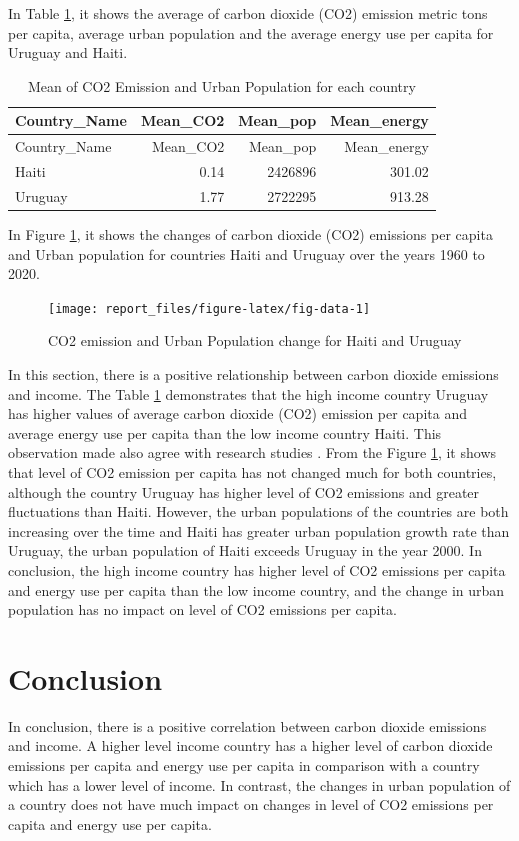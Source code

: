 \documentclass[11pt,a4paper,]{article}
\begin{document}
In Table \ref{tab:mean}, it shows the average of carbon dioxide (CO2) emission metric tons per capita, average urban population and the average energy use per capita for Uruguay and Haiti.

\begin{longtable}[]{@{}lrrr@{}}
\caption{\label{tab:mean}Mean of CO2 Emission and Urban Population for each country}\tabularnewline
\toprule
Country\_Name & Mean\_CO2 & Mean\_pop & Mean\_energy \\
\midrule
\endfirsthead
\toprule
Country\_Name & Mean\_CO2 & Mean\_pop & Mean\_energy \\
\midrule
\endhead
Haiti & 0.14 & 2426896 & 301.02 \\
Uruguay & 1.77 & 2722295 & 913.28 \\
\bottomrule
\end{longtable}

In Figure \ref{fig:fig-data}, it shows the changes of carbon dioxide (CO2) emissions per capita and Urban population for countries Haiti and Uruguay over the years 1960 to 2020.

\begin{figure}

{\centering \texttt{[image: report\_files/figure-latex/fig-data-1]} 

}

\caption{CO2 emission and Urban Population change for Haiti and Uruguay}\label{fig:fig-data}
\end{figure}

In this section, there is a positive relationship between carbon dioxide emissions and income. The Table \ref{tab:mean} demonstrates that the high income country Uruguay has higher values of average carbon dioxide (CO2) emission per capita and average energy use per capita than the low income country Haiti. This observation made also agree with research studies \textcite{COGDP}. From the Figure \ref{fig:fig-data}, it shows that level of CO2 emission per capita has not changed much for both countries, although the country Uruguay has higher level of CO2 emissions and greater fluctuations than Haiti. However, the urban populations of the countries are both increasing over the time and Haiti has greater urban population growth rate than Uruguay, the urban population of Haiti exceeds Uruguay in the year 2000. In conclusion, the high income country has higher level of CO2 emissions per capita and energy use per capita than the low income country, and the change in urban population has no impact on level of CO2 emissions per capita.

\section*{Conclusion}

In conclusion, there is a positive correlation between carbon dioxide emissions and income. A higher level income country has a higher level of carbon dioxide emissions per capita and energy use per capita in comparison with a country which has a lower level of income. In contrast, the changes in urban population of a country does not have much impact on changes in level of CO2 emissions per capita and energy use per capita.

\printbibliography
\end{document}
